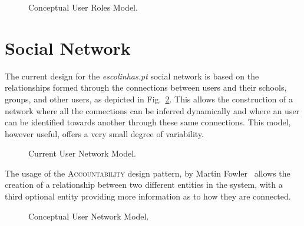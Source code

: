 \documentclass[9pt,a4paper]{extarticle}
\begin{document}
\begin{multicols}{2}
\begin{figure}[H]
  \caption{Conceptual User Roles Model.}
  \label{fig:user_roles_conceptual}
\end{figure}

\section{Social Network}\label{sec:social_network}

The current design for the \emph{escolinhas.pt} social network is based on the relationships formed through the connections between users and their schools, groups, and other users, as depicted in Fig.~\ref{fig:social_network_current}. This allows the construction of a network where all the connections can be inferred dynamically and where an user can be identified towards another through these same connections. This model, however useful, offers a very small degree of variability.

\begin{figure}[H]
  \caption{Current User Network Model.}
  \label{fig:social_network_current}
\end{figure}

The usage of the \textsc{Accountability} design pattern, by Martin Fowler~\cite{fowler_accountability} allows the creation of a relationship between two different entities in the system, with a third optional entity providing more information as to how they are connected.

\begin{figure}[H]
  \caption{Conceptual User Network Model.}
  \label{fig:social_network_conceptual}
\end{figure}


\end{multicols}
\end{document}

